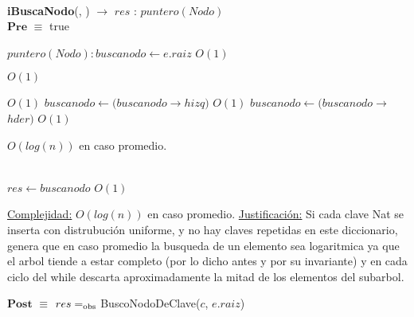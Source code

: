 


~


\begin{algorithm}[H]{\textbf{iBuscaNodo}(, ) $\to$ $res$ : $puntero(Nodo)$}
	{\\ $\textbf{Pre}$ $\equiv$ true}
	\begin{algorithmic}[1]

		\State $puntero(Nodo): buscanodo \gets e.raiz$ \Comment $O(1)$

		 \Comment $O(1)$

			 \Comment $O(1)$
				\State $buscanodo \gets (buscanodo$$\rightarrow$$hizq)$ \Comment $O(1)$
			\Else
				\State $buscanodo \gets (buscanodo$$\rightarrow$$hder)$ \Comment $O(1)$
			\EndIf

		\EndWhile \Comment $O(log(n))$ en caso promedio.

		\\
		\State $res \gets buscanodo$ \Comment $O(1)$

		\medskip
		\Statex \underline{Complejidad:} $O(log(n))$ en caso promedio.
		\Statex \underline{Justificación:} Si cada clave Nat se inserta con distrubución uniforme, y no hay claves repetidas en este diccionario, genera que en caso promedio la busqueda de un elemento sea logaritmica ya que el arbol tiende a estar completo (por lo dicho antes y por su invariante) y en cada ciclo del while descarta aproximadamente la mitad de los elementos del subarbol.

    \end{algorithmic}
    {$\textbf{Post}$ $\equiv$ $res =_{\mathrm{obs}}$ BuscoNodoDeClave($c$, $e.raiz$)}
\end{algorithm}




